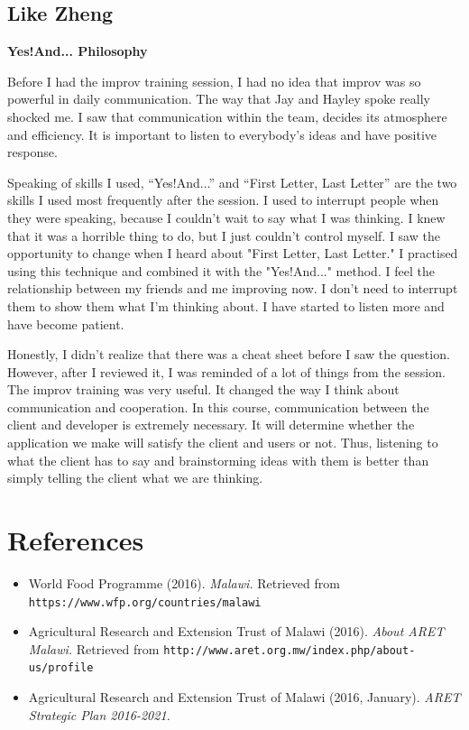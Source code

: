 \documentclass[12pt,letterpaper]{article}
\begin{document}
\subsection{Like Zheng}
\textbf{Yes!And... Philosophy}\par
Before I had the improv training session, I had no idea that improv was so powerful in daily communication. The way that Jay and Hayley spoke really shocked me. I saw that communication within the team, decides its atmosphere and efficiency. It is important to listen to everybody’s ideas and have positive response.\par
Speaking of skills I used, “Yes!And...” and “First Letter, Last Letter” are the two skills I used most frequently after the session. I used to interrupt people when they were speaking, because I couldn't wait to say what I was thinking. I knew that it was a horrible thing to do, but I just couldn't control myself. I saw the opportunity to change when I heard about "First Letter, Last Letter." I practised using this technique and combined it with the "Yes!And..." method. I feel the relationship between my friends and me improving now. I don't need to interrupt them to show them what I'm thinking about. I have started to listen more and have become patient.\par
Honestly, I didn't realize that there was a cheat sheet before I saw the question. However, after I reviewed it, I was reminded of a lot of things from the session. The improv training was very useful. It changed the way I think about communication and cooperation. In this course, communication between the client and developer is extremely necessary. It will determine whether the application we make will satisfy the client and users or not. Thus, listening to what the client has to say and brainstorming ideas with them is better than simply telling the client what we are thinking.


\clearpage
\section{References}
\begin{flushleft}
\begin{itemize}[leftmargin=12pt]

\item World Food Programme (2016). \emph{Malawi.}
 Retrieved from \texttt{https://www.wfp.org/countries/malawi}

\item Agricultural Research and Extension Trust of Malawi (2016). \emph{About ARET Malawi.}
Retrieved from \texttt{http://www.aret.org.mw/index.php/about-us/profile}

\item Agricultural Research and Extension Trust of Malawi (2016, January). \emph{ARET Strategic Plan 2016-2021.}


\end{itemize}
\end{flushleft}   
\end{document}
